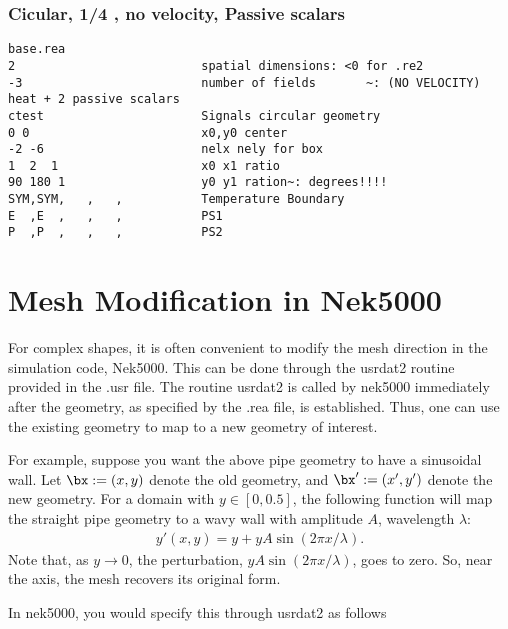 \subsubsection{ Cicular, 1/4 , no velocity, Passive scalars}
\begin{verbatim}base.rea
2                          spatial dimensions: <0 for .re2
-3                         number of fields       ~: (NO VELOCITY) heat + 2 passive scalars
ctest                      Signals circular geometry
0 0                        x0,y0 center
-2 -6                      nelx nely for box
1  2  1                    x0 x1 ratio
90 180 1                   y0 y1 ration~: degrees!!!!
SYM,SYM,   ,   ,           Temperature Boundary
E  ,E  ,   ,   ,           PS1
P  ,P  ,   ,   ,           PS2
\end{verbatim}


\section{Mesh Modification in Nek5000}

For complex shapes, it is often convenient to modify the mesh
direction in the simulation code, Nek5000.  This can be done
through the usrdat2 routine provided in the .usr file.
The routine usrdat2 is called by nek5000 immediately after
the geometry, as specified by the .rea file, is established.
Thus, one can use the existing geometry to map to a new geometry
of interest.

For example, suppose you want the above pipe geometry to have
a sinusoidal wall.  Let \(\bx := (x,y)\) denote the old geometry,
and \(\bx' := (x',y')\) denote the new geometry.  For a domain
with \(y\in [0,0.5]\), the following function will map the straight
pipe geometry to a wavy wall with amplitude \(A\), wavelength \(\lambda\):
\begin{eqnarray*}
  y'(x,y) = y  + y A \sin( 2 \pi x / \lambda ).
\end{eqnarray*}
Note that, as \(y \longrightarrow 0\), the perturbation, 
\(yA \sin( 2 \pi x / \lambda )\), goes to zero.  So, near the axis,
the mesh recovers its original form.

In nek5000, you would specify this through usrdat2 as follows


